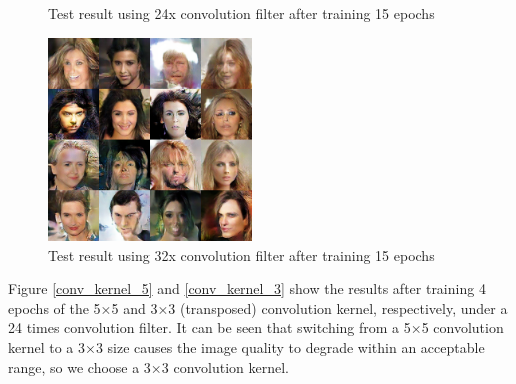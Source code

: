 \begin{figure}
\begin{minipage}[t]{0.48\linewidth}
        \caption{Test result using 24x convolution filter after training 15 epochs}
        \label{conv_filter_24}
    \end{minipage}
    \begin{minipage}[t]{\linewidth}
        \centering
        \includegraphics[width=0.48\textwidth]{figures/result_conv_filter_32.png}
        \caption{Test result using 32x convolution filter after training 15 epochs}
        \label{conv_filter_32}
    \end{minipage}
\end{figure}

Figure \ref{conv_kernel_5} and \ref{conv_kernel_3} show the results after training 4 epochs of the 5×5 and 3×3 (transposed) convolution kernel,
    respectively, under a 24 times convolution filter.
It can be seen that switching from a 5×5 convolution kernel to a 3×3 size causes the image quality to degrade within an acceptable range,
    so we choose a 3×3 convolution kernel.

